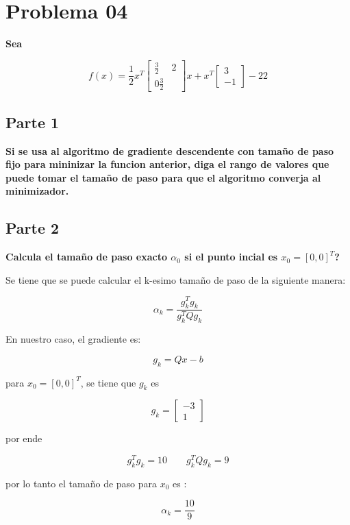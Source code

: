 \section*{Problema 04}

\textbf{Sea}

\begin{equation*}
    f(x) = \frac{1}{2}x^T \begin{bmatrix}
        \frac{3}{2} & 2 \\
        0 \frac{3}{2}
    \end{bmatrix}x + x^T \begin{bmatrix}
        3 \\ -1
    \end{bmatrix} -22
\end{equation*}

\subsection*{Parte 1}

\textbf{Si se usa al algoritmo de gradiente descendente con tamaño de paso fijo para mininizar la funcion anterior, diga el rango de valores que puede tomar el tamaño de paso para que el algoritmo converja al minimizador.}

\subsection*{Parte 2}

\textbf{Calcula el tamaño de paso exacto $\alpha_0$ si el punto incial es $x_0 = [0, 0]^T$?}

Se tiene que se puede calcular el k-esimo tamaño de paso de la siguiente manera:

\begin{equation*}
    \alpha_k = \frac{g_k^Tg_k}{g_k^TQg_k}
\end{equation*}

En nuestro caso, el gradiente es:

\begin{equation*}
    g_k = Qx-b
\end{equation*}

para $x_0 = [0, 0]^T$, se tiene que $g_k$ es

\begin{equation*}
    g_k = \begin{bmatrix}
        -3 \\ 1
    \end{bmatrix}
\end{equation*}

por ende

\begin{equation*}
    g_k^T g_k = 10 \qquad g_k^TQg_k = 9
\end{equation*}

por lo tanto el tamaño de paso para $x_0$ es :

\begin{equation*}
    \alpha_k = \frac{10}{9}
\end{equation*}